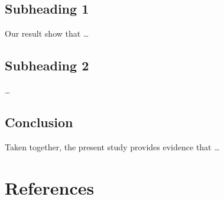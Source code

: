 \documentclass[
  man]{apa6}
\begin{document}
\hypertarget{subheading-1}{%
\subsection{Subheading 1}\label{subheading-1}}

Our result show that \ldots{}

\hypertarget{subheading-2}{%
\subsection{Subheading 2}\label{subheading-2}}

\ldots{}

\hypertarget{conclusion}{%
\subsection{Conclusion}\label{conclusion}}

Taken together, the present study provides evidence that \ldots{}

\newpage

\hypertarget{references}{%
\section{References}\label{references}}

\begingroup
\setlength{\parindent}{-0.5in}
\setlength{\leftskip}{0.5in}
\end{document}
